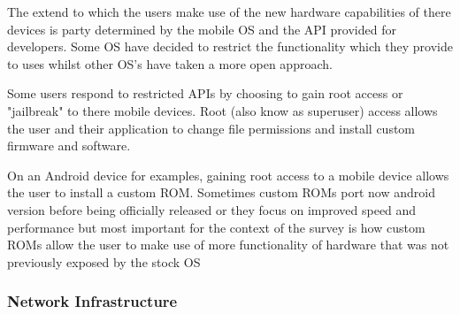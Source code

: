 \documentclass[journal]{IEEEtran}
\begin{document}

The extend to which the users make use of the new hardware capabilities of there devices is party determined by the mobile OS and the API provided for developers. Some OS have decided to restrict the functionality which they provide to uses whilst other OS's have taken a more open approach. 


Some users respond to restricted APIs by choosing to gain root access or "jailbreak" to there mobile devices. Root (also know as superuser) access allows the user and their application to change file permissions and install custom firmware and software.

On an Android device for examples, gaining root access to a mobile device allows the user to install a custom ROM. Sometimes custom ROMs port now android version before being officially released or they focus on improved speed and performance but most important for the context of the survey is how custom ROMs allow the user to make use of more functionality of hardware that was not previously exposed by the stock OS






\subsubsection{Network Infrastructure}
\end{document}
